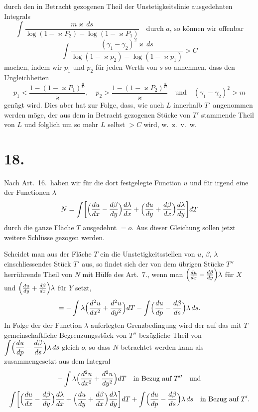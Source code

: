 \documentclass{article}
\begin{document}
durch den in Betracht gezogenen Theil der Unstetigkeitslinie ausgedehnten Integrals
\[
\int \frac{m\varkappa\,ds}{\log(1 - \varkappa P_2) - \log(1 - \varkappa P_1)} \quad \text{durch } a\text{, so können wir offenbar}
\]
\[
\int \frac{(\gamma_1 - \gamma_2)^2 \varkappa\,ds}{\log(1 - \varkappa p_2) - \log(1 - \varkappa p_1)} > C
\]
machen, indem wir $p_1$ und $p_2$ für jeden Werth von $s$ so annehmen, dass den Ungleichheiten
\[
p_1 < \frac{1 - (1 - \varkappa P_1)^{\frac{a}{C}}}{\varkappa}, \quad p_2 > \frac{1 - (1 - \varkappa P_2)^{\frac{a}{C}}}{\varkappa} \quad \text{und} \quad (\gamma_1 - \gamma_2)^2 > m
\]
genügt wird. Dies aber hat zur Folge, dass, wie auch $L$ innerhalb $T'$ angenommen werden möge, der aus dem in Betracht gezogenen Stücke von $T'$ stammende Theil von $L$ und folglich um so mehr $L$ selbst $> C$ wird, w.\ z.\ v.\ w.

\section*{18.}

Nach Art.~16.\ haben wir für die dort festgelegte Function $u$ und für irgend eine der Functionen $\lambda$
\[
N = \int \biggl[\Bigl(\frac{du}{dx} - \frac{d\beta}{dy}\Bigr)\frac{d\lambda}{dx} + \Bigl(\frac{du}{dy} + \frac{d\beta}{dx}\Bigr)\frac{d\lambda}{dy}\biggr] dT
\]
durch die ganze Fläche $T$ ausgedehnt $= o$. Aus dieser Gleichung sollen jetzt weitere Schlüsse gezogen werden.

Scheidet man aus der Fläche $T$ ein die Unstetigkeitsstellen von $u$, $\beta$, $\lambda$ einschliessendes Stück $T'$ aus, so findet sich der von dem übrigen Stücke $T''$ herrührende Theil von $N$ mit Hülfe des Art.~7., wenn man $\Bigl(\frac{du}{dx} - \frac{d\beta}{dy}\Bigr)\lambda$ für $X$ und $\Bigl(\frac{du}{dy} + \frac{d\beta}{dx}\Bigr)\lambda$ für $Y$ setzt,
\[
= -\int \lambda \Bigl(\frac{d^2u}{dx^2} + \frac{d^2u}{dy^2}\Bigr) dT - \int \Bigl(\frac{du}{dp} - \frac{d\beta}{ds}\Bigr)\lambda\,ds.
\]
In Folge der der Function $\lambda$ auferlegten Grenzbedingung wird der auf das mit $T$ gemeinschaftliche Begrenzungsstück von $T''$ bezügliche Theil von $\displaystyle\int \Bigl(\frac{du}{dp} - \frac{d\beta}{ds}\Bigr)\lambda\,ds$ gleich $o$, so dass $N$ betrachtet werden kann als zusammengesetzt aus dem Integral
\[
-\int \lambda \Bigl(\frac{d^2u}{dx^2} + \frac{d^2u}{dy^2}\Bigr) dT \quad \text{in Bezug auf } T'' \quad \text{und}
\]
\[
\int \biggl[\Bigl(\frac{du}{dx} - \frac{d\beta}{dy}\Bigr)\frac{d\lambda}{dx} + \Bigl(\frac{du}{dy} + \frac{d\beta}{dx}\Bigr)\frac{d\lambda}{dy}\biggr] dT + \int \Bigl(\frac{du}{dp} - \frac{d\beta}{ds}\Bigr)\lambda\,ds \quad \text{in Bezug auf } T'.
\]
\end{document}
